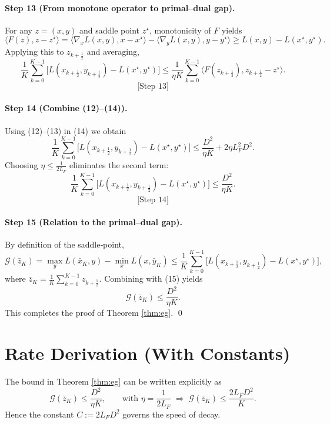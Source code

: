 \documentclass{article}
\newcommand{\gap}{\mathcal{G}}
\begin{document}
\paragraph{Step 13 (From monotone operator to primal–dual gap).}
For any $z=(x,y)$ and saddle point $z^{\star}$,
monotonicity of $F$ yields
\[
\langle F(z),z-z^{\star}\rangle
= \langle\nabla_{x}L(x,y),x-x^{\star}\rangle
-\langle\nabla_{y}L(x,y),y-y^{\star}\rangle
\ge L(x,y)-L(x^{\star},y^{\star}) .
\]
Applying this to $z_{k+\frac12}$ and averaging,
\[
\frac{1}{K}\sum_{k=0}^{K-1}\bigl[L(x_{k+\frac12},y_{k+\frac12})-L(x^{\star},y^{\star})\bigr]
\le \frac{1}{\eta K}\sum_{k=0}^{K-1}\langle F(z_{k+\frac12}),z_{k+\frac12}-z^{\star}\rangle .
\tag{14}
\]
\[
\text{[Step 13]}
\]

\paragraph{Step 14 (Combine (12)–(14)).}
Using (12)–(13) in (14) we obtain
\[
\frac{1}{K}\sum_{k=0}^{K-1}\bigl[L(x_{k+\frac12},y_{k+\frac12})-L(x^{\star},y^{\star})\bigr]
\le \frac{D^{2}}{\eta K}+2\eta L_{F}^{2}D^{2}.
\]
Choosing $\eta\le\frac{1}{2L_{F}}$ eliminates the second term:
\[
\frac{1}{K}\sum_{k=0}^{K-1}\bigl[L(x_{k+\frac12},y_{k+\frac12})-L(x^{\star},y^{\star})\bigr]
\le \frac{D^{2}}{\eta K}.
\tag{15}
\]
\[
\text{[Step 14]}
\]

\paragraph{Step 15 (Relation to the primal–dual gap).}
By definition of the saddle‑point,
\[
\gap(\bar z_{K})=
\max_{y}L(\bar x_{K},y)-\min_{x}L(x,\bar y_{K})
\le \frac{1}{K}\sum_{k=0}^{K-1}\bigl[L(x_{k+\frac12},y_{k+\frac12})-L(x^{\star},y^{\star})\bigr],
\]
where $\bar z_{K}=\frac{1}{K}\sum_{k=0}^{K-1}z_{k+\frac12}$. Combining with (15) yields
\[
\gap(\bar z_{K})\le\frac{D^{2}}{\eta K}.
\]
This completes the proof of Theorem \ref{thm:eg}. \qed

\section*{Rate Derivation (With Constants)}
The bound in Theorem \ref{thm:eg} can be written explicitly as
\[
\gap(\bar z_{K})\le \frac{D^{2}}{\eta K},
\qquad\text{with }\eta=\frac{1}{2L_{F}}\;\Longrightarrow\;
\gap(\bar z_{K})\le \frac{2L_{F}D^{2}}{K}.
\]
Hence the constant $C:=2L_{F}D^{2}$ governs the speed of decay.
\end{document}
